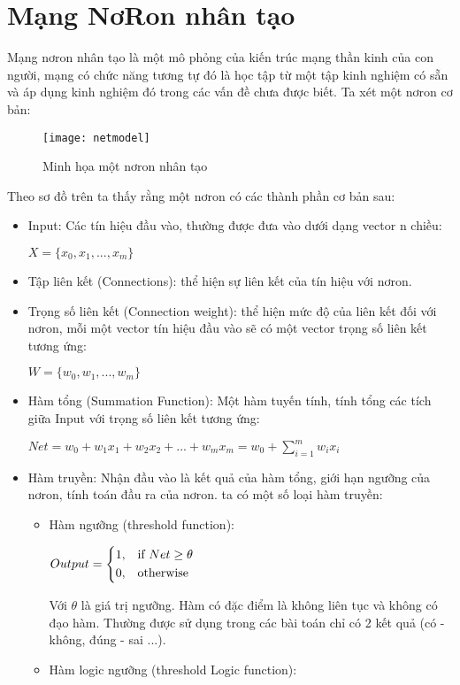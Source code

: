 \documentclass[13pt, a4paper]{extreport}
\begin{document}
\section{Mạng NơRon nhân tạo}
Mạng nơron nhân tạo là một mô phỏng của kiến trúc mạng thần kinh của con người, mạng có chức năng tương tự đó là học tập từ một tập kinh nghiệm có sẵn và áp dụng kinh nghiệm đó trong các vấn đề chưa được biết. Ta xét một nơron cơ bản:
  \begin{figure}[H]
  	\centering
    \texttt{[image: netmodel]}
    \caption{\large Minh họa một nơron nhân tạo}
  \end{figure}
Theo sơ đồ trên ta thấy rằng một nơron có các thành phần cơ bản sau:
\begin{itemize}
\item Input: Các tín hiệu đầu vào, thường được đưa vào dưới dạng vector n chiều:\\
	\centerline {$X = \{x_0, x_1, ..., x_m\}$}
\item Tập liên kết (Connections): thể hiện sự liên kết của tín hiệu với nơron.
\item Trọng số liên kết (Connection weight): thể hiện mức độ của liên kết đối với nơron, mỗi một vector tín hiệu đầu vào sẽ có một vector trọng số liên kết tương ứng:\\
	\centerline {$W = \{w_0, w_1, ..., w_m\}$}
\item Hàm tổng (Summation Function): Một hàm tuyến tính, tính tổng các tích giữa Input với trọng số liên kết tương ứng:\\
	\centerline {$Net = w_0 + w_1x_1 + w_2x_2 + ... + w_mx_m = w_0 + \sum\limits_{i=1}^m w_ix_i$}
\item Hàm truyền: Nhận đầu vào là kết quả của hàm tổng, giới hạn ngưỡng của nơron, tính toán đầu ra của nơron. ta có một số loại hàm truyền:
	\begin{itemize}
		\item Hàm ngưỡng (threshold function):
		  \begin{center}
			$Output = \begin{dcases} 1, & \text{if } Net \geq \theta\\ 0, & \text{otherwise} \end{dcases}$
		  \end{center}	
		Với $\theta$ là giá trị ngưỡng. Hàm có đặc điểm là không liên tục và không có đạo hàm. Thường được sử dụng trong các bài toán chỉ có 2 kết quả (có - không, đúng - sai ...).
		\item Hàm logic ngưỡng (threshold Logic function):

\end{itemize}
\end{itemize}
\end{document}

